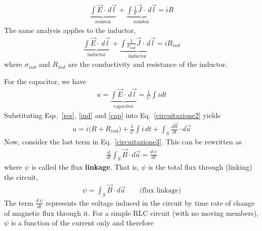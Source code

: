 \documentclass[12pt,a4paper,oneside]{book}
\begin{document}
\begin{onehalfspace}
\begin{equation}
\begin{aligned}
		\underbrace{\int\vec{E}\cdot\,d\vec{l}}_{\text{resistor}} \, + 
	\underbrace{\int\frac{1}{\sigma}\vec{J}\cdot\,d\vec{l}}_{\text{resistor}} = iR
	\end{aligned}
\end{equation} 
The same analysis applies to the inductor, 
\begin{equation}\label{ind}
	\begin{aligned}
		\underbrace{\int\vec{E}\cdot\,d\vec{l}}_{\text{inductor}} \, + 
		\underbrace{\int\frac{1}{\sigma_{ind}}\vec{J}\cdot\,d\vec{l}}_{\text{inductor}} = iR_{ind}
	\end{aligned}
\end{equation} 
where $\sigma_{ind}$ and $R_{ind}$ are the conductivity and resistance of the inductor. 

For the capacitor, we have
\begin{equation}\label{cap}
	\begin{aligned}
		u = \underbrace{\int\vec{E}\cdot\,d\vec{l}}_{\text{capacitor}} =\frac{1}{C}\int idt
	\end{aligned}
\end{equation} 
Substituting Eqs.~\eqref{res}, \ref{ind} and \ref{cap} into Eq.~\eqref{circuitazione2} yields
\begin{equation}\label{circuitazione3}
	\begin{aligned}
		u = i\big(R+R_{ind}\big)+\frac{1}{C}\int i\,dt+\int_{S}\frac{\partial \vec{B}}{\partial t}\cdot d\vec{a}
	\end{aligned}
\end{equation} 
Now, consider the last term in Eq.~\eqref{circuitazione3}. This can be rewritten as
\begin{equation}\label{flux}
	\begin{aligned}
		\frac{d}{dt} \int_{S}\vec{B}\cdot d\vec{a} = \frac{d\,\psi}{dt}
	\end{aligned}
\end{equation} 
where $\psi$ is called the flux \textbf{linkage}. That is, $\psi$ is the total flux through (linking) the circuit,
\begin{equation}\label{flux_linkage}
	\begin{aligned}
		\psi = \int_{S}\vec{B}\cdot d\vec{a} \qquad\text{(flux linkage)}
	\end{aligned}
\end{equation} 
The term $\frac{d\,\psi}{dt}$ represents the voltage induced in the circuit by time rate of change of magnetic flux through it. For a simple RLC circuit (with no moving members), $\psi$ is a function of the current only and therefore

\end{onehalfspace}
\end{document}
